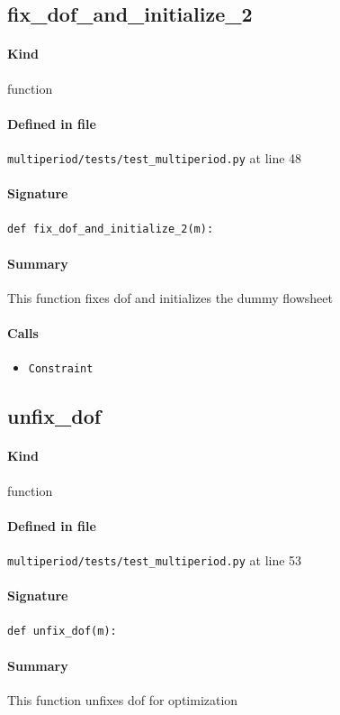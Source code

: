 \documentclass[11pt]{report}
\begin{document}
\subsection{fix\_dof\_and\_initialize\_2}
\label{def:multiperiod-tests-test_multiperiod.py:fix_dof_and_initialize_2:L48}
\paragraph{Kind} function
\paragraph{Defined in file} \texttt{multiperiod/tests/test\_multiperiod.py} at line 48
\paragraph{Signature} \texttt{def fix\_dof\_and\_initialize\_2(m):}
\paragraph{Summary} This function fixes dof and initializes the dummy flowsheet
\paragraph{Calls}
\begin{itemize}[leftmargin=*]
  \item \texttt{Constraint}
\end{itemize}
\subsection{unfix\_dof}
\label{def:multiperiod-tests-test_multiperiod.py:unfix_dof:L53}
\paragraph{Kind} function
\paragraph{Defined in file} \texttt{multiperiod/tests/test\_multiperiod.py} at line 53
\paragraph{Signature} \texttt{def unfix\_dof(m):}
\paragraph{Summary} This function unfixes dof for optimization
\end{document}

